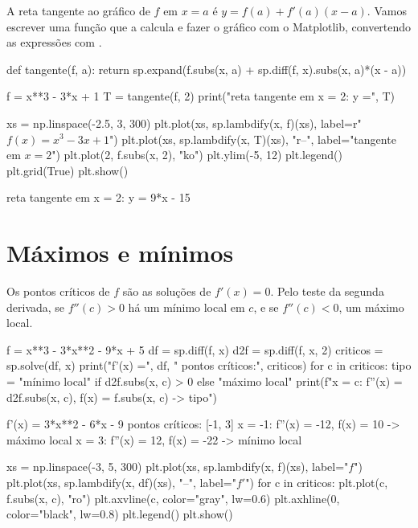 A reta tangente ao gráfico de $f$ em $x=a$ é $y=f(a)+f'(a)(x-a)$. Vamos escrever uma função que a calcula e
fazer o gráfico com o Matplotlib, convertendo as expressões com .

\begin{entrada}
def tangente(f, a):
    return sp.expand(f.subs(x, a) + sp.diff(f, x).subs(x, a)*(x - a))

f = x**3 - 3*x + 1
T = tangente(f, 2)
print("reta tangente em x = 2:  y =", T)

xs = np.linspace(-2.5, 3, 300)
plt.plot(xs, sp.lambdify(x, f)(xs), label=r"$f(x)=x^3-3x+1$")
plt.plot(xs, sp.lambdify(x, T)(xs), "r--", label="tangente em $x=2$")
plt.plot(2, f.subs(x, 2), "ko")
plt.ylim(-5, 12)
plt.legend()
plt.grid(True)
plt.show()
\end{entrada}
\begin{saida}
reta tangente em x = 2:  y = 9*x - 15
\end{saida}

\section{Máximos e mínimos}

Os pontos críticos de $f$ são as soluções de $f'(x)=0$. Pelo teste da segunda derivada, se $f''(c)>0$ há um mínimo
local em $c$, e se $f''(c)<0$, um máximo local.

\begin{entrada}
f = x**3 - 3*x**2 - 9*x + 5
df = sp.diff(f, x)
d2f = sp.diff(f, x, 2)
criticos = sp.solve(df, x)
print("f'(x) =", df, "   pontos críticos:", criticos)
for c in criticos:
    tipo = "mínimo local" if d2f.subs(x, c) > 0 else "máximo local"
    print(f"x = {c}: f''(x) = {d2f.subs(x, c)},  f(x) = {f.subs(x, c)}  ->  {tipo}")
\end{entrada}
\begin{saida}
f'(x) = 3*x**2 - 6*x - 9    pontos críticos: [-1, 3]
x = -1: f''(x) = -12,  f(x) = 10  ->  máximo local
x = 3: f''(x) = 12,  f(x) = -22  ->  mínimo local
\end{saida}

\begin{entrada}
xs = np.linspace(-3, 5, 300)
plt.plot(xs, sp.lambdify(x, f)(xs), label="$f$")
plt.plot(xs, sp.lambdify(x, df)(xs), "--", label="$f'$")
for c in criticos:
    plt.plot(c, f.subs(x, c), "ro")
    plt.axvline(c, color="gray", lw=0.6)
plt.axhline(0, color="black", lw=0.8)
plt.legend()
plt.show()
\end{entrada}

